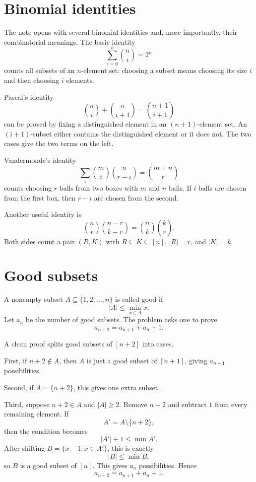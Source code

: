 

\section{Binomial identities}

The note opens with several binomial identities and, more importantly, their combinatorial meanings.  The basic identity
\[
  \sum_{i=0}^n \binom ni=2^n
\]
counts all subsets of an $n$-element set: choosing a subset means choosing its size $i$ and then choosing $i$ elements.

Pascal's identity
\[
  \binom ni+\binom n{i+1}=\binom{n+1}{i+1}
\]
can be proved by fixing a distinguished element in an $(n+1)$-element set.  An $(i+1)$-subset either contains the distinguished element or it does not.  The two cases give the two terms on the left.

Vandermonde's identity
\[
  \sum_i \binom mi \binom n{r-i}=\binom{m+n}{r}
\]
counts choosing $r$ balls from two boxes with $m$ and $n$ balls.  If $i$ balls are chosen from the first box, then $r-i$ are chosen from the second.

Another useful identity is
\[
  \binom nr \binom{n-r}{k-r}=\binom nk \binom kr.
\]
Both sides count a pair $(R,K)$ with $R\subseteq K\subseteq[n]$, $|R|=r$, and $|K|=k$.

\section{Good subsets}

A nonempty subset $A\subseteq\{1,2,\ldots,n\}$ is called good if
\[
  |A|\le \min_{x\in A}x.
\]
Let $a_n$ be the number of good subsets.  The problem asks one to prove
\[
  a_{n+2}=a_{n+1}+a_n+1.
\]

A clean proof splits good subsets of $[n+2]$ into cases.

First, if $n+2\notin A$, then $A$ is just a good subset of $[n+1]$, giving $a_{n+1}$ possibilities.

Second, if $A=\{n+2\}$, this gives one extra subset.

Third, suppose $n+2\in A$ and $|A|\ge2$.  Remove $n+2$ and subtract $1$ from every remaining element.  If
\[
  A'=A\setminus\{n+2\},
\]
then the condition becomes
\[
  |A'|+1\le \min A'.
\]
After shifting $B=\{x-1:x\in A'\}$, this is exactly
\[
  |B|\le \min B,
\]
so $B$ is a good subset of $[n]$.  This gives $a_n$ possibilities.  Hence
\[
  a_{n+2}=a_{n+1}+a_n+1.
\]

